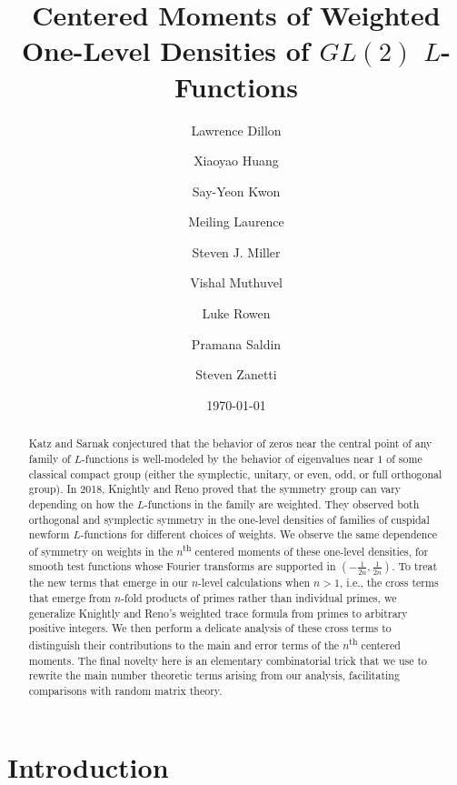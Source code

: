 \documentclass[12pt, reqno,oneside]{amsart}
\title{Centered Moments of Weighted One-Level Densities of $GL(2)$ $L$-Functions}
\author{Lawrence Dillon}
\author{Xiaoyao Huang}
\author{Say-Yeon Kwon}
\author{Meiling Laurence}
\author{Steven J. Miller}
\author{Vishal Muthuvel}
\author{Luke Rowen}
\author{Pramana Saldin}
\author{Steven Zanetti}
\date{\today}
\theoremstyle{plain}
\theoremstyle{definition}
\theoremstyle{remark}
\theoremstyle{plain}
\numberwithin{equation}{section}
\begin{document}
\begingroup

%
%

\begin{abstract}

Katz and Sarnak conjectured that the behavior of zeros near the central point of any family of $L$-functions is well-modeled by the behavior of eigenvalues near $1$ of some classical compact group (either the symplectic, unitary, or even, odd, or full orthogonal group). In 2018, Knightly and Reno proved that the symmetry group can vary depending on how the $L$-functions in the family are weighted. They observed both orthogonal and symplectic symmetry in the one-level densities of families of cuspidal newform $L$-functions for different choices of weights. We observe the same dependence of symmetry on weights in the $n$\textsuperscript{th} centered moments of these one-level densities, for smooth test functions whose Fourier transforms are supported in $\left(-\frac{1}{2n}, \frac{1}{2n}\right)$. To treat the new terms that emerge in our $n$-level calculations when $n>1$, i.e., the cross terms that emerge from $n$-fold products of primes rather than individual primes, we generalize Knightly and Reno's weighted trace formula from primes to arbitrary positive integers. We then perform a delicate analysis of these cross terms to distinguish their contributions to the main and error terms of the $n$\textsuperscript{th} centered moments. The final novelty here is an elementary combinatorial trick that we use to rewrite the main number theoretic terms arising from our analysis, facilitating comparisons with random matrix theory. 

\end{abstract}

\maketitle
\vspace{-1cm}
\tableofcontents

%
%

\section{Introduction}\label{sec:1}
\end{document}
